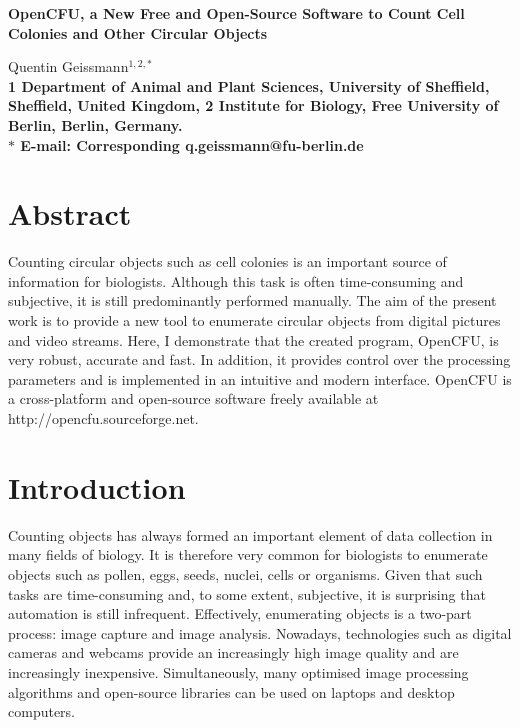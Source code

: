 \documentclass[10pt]{article}
\date{}
\newcommand{\website}{http://opencfu.sourceforge.net}
\begin{document}

\begin{flushleft}
{\Large
\textbf{OpenCFU, a New Free and Open-Source Software to Count Cell Colonies and
Other Circular Objects}}

Quentin Geissmann$^{1,2,\ast}$
\\


\bf{1} Department of Animal and Plant Sciences, University of Sheffield,
Sheffield, United Kingdom, \bf{2} Institute for Biology, Free University of 
Berlin, Berlin, Germany. \\ $\ast$ E-mail: Corresponding
q.geissmann@fu-berlin.de
\end{flushleft}

\section*{Abstract}

Counting circular objects such as cell colonies is an important source of
information for biologists.
Although this task is often time-consuming and subjective, it is still
predominantly performed manually. The aim of the present work is to provide a
new tool to enumerate circular objects from digital pictures and video streams.
Here, I demonstrate that the created program, OpenCFU, is very robust, accurate and
fast. In addition, it provides control over the processing parameters and is
implemented in an intuitive and modern interface. OpenCFU is a cross-platform
and open-source software freely available at \website{}.

\section*{Introduction}

Counting objects has always formed an important element of data collection in
many fields of biology.
It is therefore very common for
biologists to enumerate objects such as pollen\cite{costa_counting_2009},
eggs\cite{mello_image_2008}, seeds\cite{severini_counting_2011},
nuclei\cite{forero_deadeasy_2010}, cells\cite{kachouie_arraycount_2009} or organisms\cite{yati_flycounter:_2011}.
Given that
such tasks are time-consuming and, to some extent, subjective, it is
surprising that automation is still infrequent. 
Effectively, enumerating objects is a two-part process: image capture and image
analysis. Nowadays, technologies such as digital cameras and webcams provide
an increasingly high image quality and are increasingly inexpensive.
Simultaneously, many optimised image processing
algorithms and open-source libraries can be used on laptops
and desktop computers.
\end{document}
